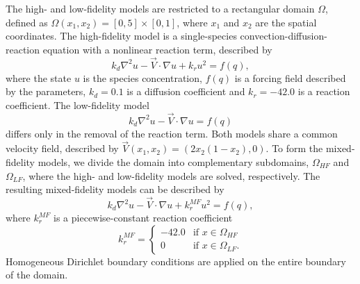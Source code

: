 The high- and low-fidelity models are restricted to a rectangular domain $\Omega$, defined as $\Omega(x_1,x_2)=[0,5]\times[0,1]$, where $x_1$ and $x_2$ are the spatial coordinates. The high-fidelity model is a single-species convection-diffusion-reaction equation with a nonlinear reaction term, described by
\begin{equation}
k_d\nabla^2 u - \vec{V}\cdot\nabla u + k_ru^2= f(q),
\label{eq:cdvcdrHF}
\end{equation}
where the state $u$ is the species concentration, $f(q)$ is a forcing field described by the parameters, $k_d = 0.1$ is a diffusion coefficient and $k_r = -42.0$ is a reaction coefficient. The low-fidelity model
\begin{equation}
k_d\nabla^2 u - \vec{V}\cdot\nabla u = f(q)
\end{equation}
differs only in the removal of the reaction term. Both models share a common velocity field, described by $\vec{V}(x_1,x_2) = (2x_2(1-x_2),0)$. To form the mixed-fidelity models, we divide the domain into complementary subdomains, $\Omega_{HF}$ and $\Omega_{LF}$, where the high- and low-fidelity models are solved, respectively. The resulting mixed-fidelity models can be described by 
\begin{equation}
k_d\nabla^2 u - \vec{V}\cdot\nabla u + k^{MF}_ru^2= f(q),
\end{equation}
where $k^{MF}_r$ is a piecewise-constant reaction coefficient
\begin{equation}
k^{MF}_r=
\begin{cases}
-42.0 & \textrm{if }x\in\Omega_{HF} \\
0 & \textrm{if }x\in\Omega_{LF}.
\end{cases}
\end{equation}
Homogeneous Dirichlet boundary conditions are applied on the entire boundary of the domain.

